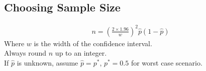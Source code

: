 \documentclass[10pt, a4paper, titlepage]{article}
\begin{document}
\begin{multicols*}{3}
	\dotfill
	\subsection{Choosing Sample Size}
	\begin{align}
		n=\left(\frac{2\times 1.96}{w}\right)^2\hat{p}(1-\hat{p})
	\end{align}
	Where $w$ is the width of the confidence interval.\\
	Always round $n$ up to an integer.\\
	If $\hat{p}$ is unknown, assume $\hat{p}=p^*$, $p^*=0.5$ for worst case scenario.\\

\hrulefill
\end{multicols*}
\end{document}
